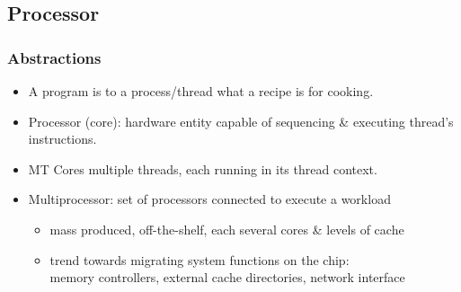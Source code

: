 \documentclass{beamer}
\newcommand{\emp}[1]{\textcolor{DikuRed}{ #1}}
\begin{document}
\begin{frame}[fragile]
	\tableofcontents[currentsection]
\end{frame}

\subsection{Processor}

\begin{frame}[fragile,t]
\frametitle{Abstractions}
\medskip

\begin{itemize}
    \item A \emp{program} is to a \emp{process/thread} 
            what a recipe is for cooking.\smallskip

    \item \emp{Processor (core)}: hardware entity capable of
            sequencing \& executing thread's instructions.\smallskip

    \item \emp{MT Cores} multiple threads, each 
            running in its thread context.\smallskip

    \item \emp{Multiprocessor:} set of processors connected to execute a workload
        \begin{itemize}
            \item mass produced, off-the-shelf, each several cores \& levels of cache
            \item trend towards migrating system functions on the chip:\\
                    memory controllers, external cache directories, network interface
        \end  {itemize}
\end{itemize}


\end{frame}
\end{document}
